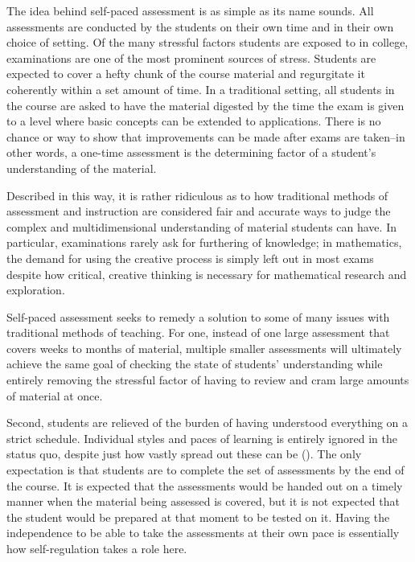 The idea behind self-paced assessment is as simple as its name sounds. All assessments are conducted by the students on their own time and in their own choice of setting. Of the many stressful factors students are exposed to in college, examinations are one of the most prominent sources of stress. Students are expected to cover a hefty chunk of the course material and regurgitate it coherently within a set amount of time. In a traditional setting, all students in the course are asked to have the material digested by the time the exam is given to a level where basic concepts can be extended to applications. There is no chance or way to show that improvements can be made after exams are taken--in other words, a one-time assessment is the determining factor of a student's understanding of the material.

Described in this way, it is rather ridiculous as to how traditional methods of assessment and instruction are considered fair and accurate ways to judge the complex and multidimensional understanding of material students can have. In particular, examinations rarely ask for furthering of knowledge; in mathematics, the demand for using the creative process is simply left out in most exams despite how critical, creative thinking is necessary for mathematical research and exploration.

Self-paced assessment seeks to remedy a solution to some of many issues with traditional methods of teaching. For one, instead of one large assessment that covers weeks to months of material, multiple smaller assessments will ultimately achieve the same goal of checking the state of students' understanding while entirely removing the stressful factor of having to review and cram large amounts of material at once.

Second, students are relieved of the burden of having understood everything on a strict schedule. Individual styles and paces of learning is entirely ignored in the status quo, despite just how vastly spread out these can be (\cite{busato_intellectual_2000}). The only expectation is that students are to complete the set of assessments by the end of the course. It is expected that the assessments would be handed out on a timely manner when the material being assessed is covered, but it is not expected that the student would be prepared at that moment to be tested on it. Having the independence to be able to take the assessments at their own pace is essentially how self-regulation takes a role here.

